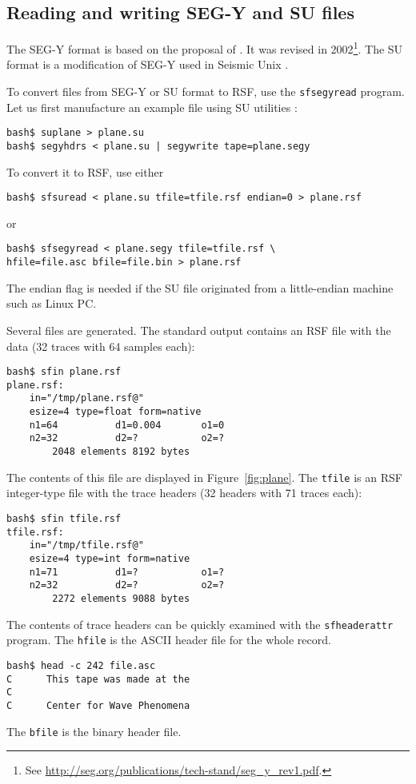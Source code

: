 \subsection{Reading and writing SEG-Y and SU files}

The SEG-Y format is based on the proposal of \cite{GEO40-02-03440352}.
It was revised in 2002\footnote{See \url{http://seg.org/publications/tech-stand/seg_y_rev1.pdf}.}. The
SU format is a modification of SEG-Y used in Seismic Unix
\cite[]{TLE16-07-10451049}.

To convert files from SEG-Y or SU format to RSF, use the \texttt{sfsegyread}
program. Let us first manufacture an example file using SU utilities
\cite[]{su}:
\begin{verbatim}
bash$ suplane > plane.su
bash$ segyhdrs < plane.su | segywrite tape=plane.segy
\end{verbatim}
To convert it to RSF, use either
\begin{verbatim}
bash$ sfsuread < plane.su tfile=tfile.rsf endian=0 > plane.rsf
\end{verbatim}
or
\begin{verbatim}
bash$ sfsegyread < plane.segy tfile=tfile.rsf \
hfile=file.asc bfile=file.bin > plane.rsf
\end{verbatim}
The endian flag is needed if the SU file originated from a little-endian
machine such as Linux PC.

Several files are generated. The standard output contains an RSF file with the
data (32 traces with 64 samples each):
\begin{verbatim}
bash$ sfin plane.rsf
plane.rsf:
    in="/tmp/plane.rsf@"
    esize=4 type=float form=native
    n1=64          d1=0.004       o1=0
    n2=32          d2=?           o2=?
        2048 elements 8192 bytes
\end{verbatim}
The contents of this file are displayed in Figure~\ref{fig:plane}.
The \texttt{tfile} is an RSF integer-type file with the trace headers (32
headers with 71 traces each):
\begin{verbatim}
bash$ sfin tfile.rsf
tfile.rsf:
    in="/tmp/tfile.rsf@"
    esize=4 type=int form=native
    n1=71          d1=?           o1=?
    n2=32          d2=?           o2=?
        2272 elements 9088 bytes
\end{verbatim}
The contents of trace headers can be quickly examined with the 
\texttt{sfheaderattr} program.
The \texttt{hfile} is the ASCII header file for the whole record.
\begin{verbatim}
bash$ head -c 242 file.asc
C      This tape was made at the
C                                                                              
C      Center for Wave Phenomena                         
\end{verbatim}
The  \texttt{bfile} is the binary header file.

